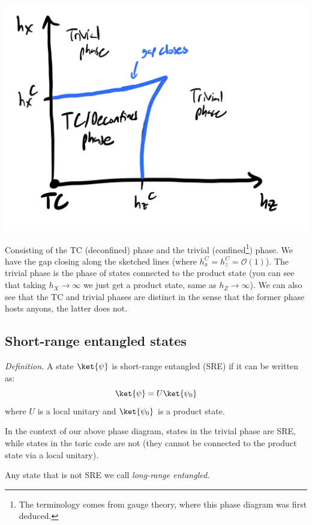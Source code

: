 \begin{center}
    \includegraphics[scale=0.35]{Lectures/Images/lec12-TCphasediagram.png}
\end{center}

Consisting of the TC (deconfined) phase and the trivial (confined\footnote{The terminology comes from gauge theory, where this phase diagram was first deduced. }) phase. We have the gap closing along the sketched lines (where $h_x^C = h_z^C = \mathcal{O}(1)$). The trivial phase is the phase of states connected to the product state (you can see that taking $h_X \to \infty$ we just get a product state, same as $h_Z \to \infty$). We can also see that the TC and trivial phases are distinct in the sense that the former phase hosts anyons, the latter does not.

\subsection{Short-range entangled states}
\textit{Definition.} A state $\ket{\psi}$ is short-range entangled (SRE) if it can be written as:
\begin{equation}
    \ket{\psi} = U\ket{\psi_0}
\end{equation}
where $U$ is a local unitary and $\ket{\psi_0}$ is a product state.

In the context of our above phase diagram, states in the trivial phase are SRE, while states in the toric code are not (they cannot be connected to the product state via a local unitary).

Any state that is not SRE we call \emph{long-range entangled}.